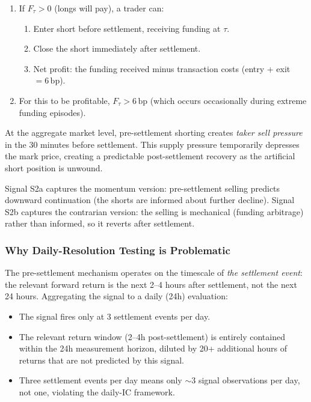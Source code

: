 \documentclass[12pt, a4paper]{article}
\theoremstyle{plain}
\theoremstyle{definition}
\newcommand{\bp}{\,\mathrm{bp}}
\begin{document}
\begin{enumerate}
  \item If $F_\tau > 0$ (longs will pay), a trader can:
        \begin{enumerate}
          \item Enter short before settlement, receiving funding at $\tau$.
          \item Close the short immediately after settlement.
          \item Net profit: the funding received minus transaction costs
                (entry + exit $= 6\bp$).
        \end{enumerate}
  \item For this to be profitable, $F_\tau > 6\bp$ (which occurs
        occasionally during extreme funding episodes).
\end{enumerate}

At the aggregate market level, pre-settlement shorting creates
\emph{taker sell pressure} in the 30 minutes before settlement.
This supply pressure temporarily depresses the mark price, creating
a predictable post-settlement recovery as the artificial short position
is unwound.

Signal S2a captures the momentum version: pre-settlement selling predicts
downward continuation (the shorts are informed about further decline).
Signal S2b captures the contrarian version: the selling is mechanical
(funding arbitrage) rather than informed, so it reverts after settlement.

\subsubsection{Why Daily-Resolution Testing is Problematic}

The pre-settlement mechanism operates on the timescale of \emph{the
settlement event}: the relevant forward return is the next 2--4 hours
after settlement, not the next 24 hours.  Aggregating the signal to a
daily (24h) evaluation:

\begin{itemize}
  \item The signal fires only at 3 settlement events per day.
  \item The relevant return window (2--4h post-settlement) is entirely
        contained within the 24h measurement horizon, diluted by 20+
        additional hours of returns that are not predicted by this signal.
  \item Three settlement events per day means only $\sim 3$ signal
        observations per day, not one, violating the daily-IC framework.
\end{itemize}
\end{document}
